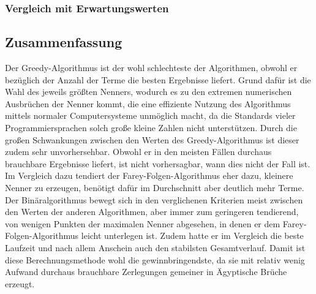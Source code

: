 \subsubsection{Vergleich mit Erwartungswerten}

\subsection{Zusammenfassung}
Der Greedy-Algorithmus ist der wohl schlechteste der Algorithmen, obwohl er bezüglich der Anzahl der Terme die besten Ergebnisse liefert. Grund dafür ist die Wahl des jeweils größten Nenners, wodurch es zu den extremen numerischen Ausbrüchen der Nenner kommt, die eine effiziente Nutzung des Algorithmus mittels normaler Computersysteme unmöglich macht, da die Standards vieler Programmiersprachen solch große \bzw kleine Zahlen nicht unterstützen. Durch die großen Schwankungen zwischen den Werten des Greedy-Algorithmus ist dieser zudem sehr unvorhersehbar. Obwohl er in den meisten Fällen durchaus brauchbare Ergebnisse liefert, ist nicht vorhersagbar, wann dies nicht der Fall ist. Im Vergleich dazu tendiert der Farey-Folgen-Algorithmus eher dazu, kleinere Nenner zu erzeugen, benötigt dafür im Durchschnitt aber deutlich mehr Terme. Der Binäralgorithmus bewegt sich in den verglichenen Kriterien meist zwischen den Werten der anderen Algorithmen, aber immer zum geringeren tendierend, von wenigen Punkten der maximalen Nenner abgesehen, in denen er dem Farey-Folgen-Algorithmus leicht unterlegen ist. Zudem hatte er im Vergleich die beste Laufzeit und nach allem Anschein auch den stabilsten Gesamtverlauf. Damit ist diese Berechnungsmethode wohl die gewinnbringendste, da sie mit relativ wenig Aufwand durchaus brauchbare Zerlegungen gemeiner in Ägyptische Brüche erzeugt.
